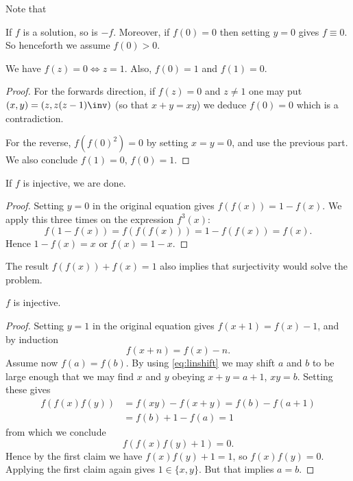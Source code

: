 \documentclass[11pt]{scrartcl}
\begin{document}
Note that
\begin{itemize}
  \ii If $f$ is a solution, so is $-f$.
  \ii Moreover, if $f(0)=0$ then setting $y=0$ gives $f\equiv0$.
  So henceforth we assume $f(0)>0$.
\end{itemize}

\begin{claim*}
  We have $f(z) = 0 \iff z =1$.
  Also, $f(0)=1$ and $f(1)=0$.
\end{claim*}
\begin{proof}
  For the forwards direction, if $f(z)=0$ and $z \neq 1$
  one may put $(x,y) = \left( z, z(z-1)\inv \right)$
  (so that $x+y=xy$) we deduce $f(0) = 0$
  which is a contradiction.

  For the reverse, $f(f(0)^2)=0$ by setting $x=y=0$,
  and use the previous part.
  We also conclude $f(1) = 0$, $f(0) = 1$.
\end{proof}

\begin{claim*}
  If $f$ is injective, we are done.
\end{claim*}
\begin{proof}
  Setting $y=0$ in the original equation
  gives $f(f(x)) = 1-f(x)$.
  We apply this three times on the expression $f^3(x)$:
  \[ f(1-f(x)) = f(f(f(x))) = 1 - f(f(x)) = f(x). \]
  Hence $1-f(x) = x$ or $f(x) = 1-x$.
\end{proof}
\begin{remark*}
  The result $f(f(x)) + f(x) = 1$ also implies that surjectivity
  would solve the problem.
\end{remark*}

\begin{claim*}
  $f$ is injective.
\end{claim*}
\begin{proof}
  Setting $y=1$ in the original equation gives
  $f(x+1) = f(x)-1$, and by induction
  \begin{equation}
    f(x+n) = f(x)-n.
    \label{eq:linshift}
  \end{equation}
  Assume now $f(a) = f(b)$.
  By using \eqref{eq:linshift} we may shift $a$ and $b$
  to be large enough that
  we may find $x$ and $y$ obeying $x+y=a+1$, $xy=b$.
  Setting these gives
  \begin{align*}
    f(f(x)f(y)) &= f(xy) - f(x+y) = f(b) - f(a+1) \\
    &= f(b) + 1 - f(a) = 1
  \end{align*}
  from which we conclude
  \[ f\left( f(x)f(y) + 1 \right) = 0. \]
  Hence by the first claim
  we have $f(x)f(y) + 1 = 1$, so $f(x)f(y) = 0$.
  Applying the first claim again gives $1 \in \{x,y\}$.
  But that implies $a=b$.
\end{proof}
\end{document}
